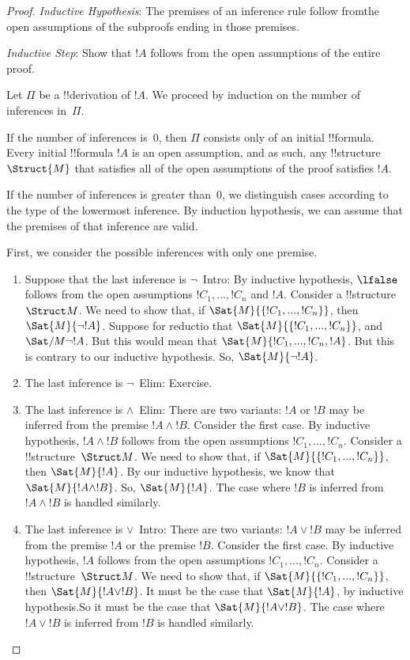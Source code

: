 \documentclass[../../include/open-logic-section]{subfiles}
\begin{document}
\begin{proof}
\emph{Inductive Hypothesis}: The premises of an inference rule follow
fromthe open assumptions of the subproofs ending in those premises.
 
\emph{Inductive Step}: Show that $!A$ follows from the open assumptions of
the entire
proof.

Let $\Pi$ be a !!{derivation} of $!A$. We proceed by
induction on the number of inferences in~$\Pi$.

If the number of inferences is~0, then $\Pi$ consists only of an
initial !!{formula}. Every initial !!{formula} $!A$ is an open assumption,
and as such, any !!{structure} $\Struct{M}$ that satisfies all of the
open assumptions of the proof satisfies $!A$.

If the number of inferences is greater than~0, we distinguish cases
according to the type of the lowermost inference. By induction
hypothesis, we can assume that the premises of that inference are
valid.

First, we consider the possible inferences with only one premise.

\begin{enumerate}
\item Suppose that the last inference is $\lnot$~Intro: 
By inductive hypothesis, $\lfalse$ follows from the open assumptions
$!C_1,...,!C_n$ and $!A$. Consider a !!{structure}~$\Struct M$. We need to
show that, if $\Sat{M}{\{!C_1,...,!C_n\}}$,
then $\Sat{M}{\lnot !A}$. Suppose for reductio that
$\Sat{M}{\{!C_1,...,!C_n\}}$,
and $\Sat/{M}{\lnot !A}$. But this would mean that $\Sat{M}{!C_1,...,!C_n,
!A}$. But this is contrary to our inductive hypothesis. So, $\Sat{M}{\lnot !A}$.
  
\item The last inference is $\lnot$~Elim: Exercise.

\item The last inference is $\land$~Elim: There are two variants: $!A$ or
$!B$ may be inferred from the premise $!A \land !B$. Consider the first
case.
By inductive hypothesis, $!A \land !B$ follows from the open assumptions 
$!C_1,...,!C_n$. Consider a !!{structure}~$\Struct M$. We need to show
that, if $\Sat{M}{\{!C_1,...,!C_n\}}$,
then $\Sat{M}{!A}$. By our inductive hypothesis, we know that
$\Sat{M}{!A\land !B}$. So, $\Sat{M}{!A}$.
  The case where $!B$ is inferred from $!A \land !B$ is handled similarly.
  
\item The last inference is $\lor$~Intro: There are two variants: $!A \lor
!B$ may be inferred from the premise $!A$ or the premise $!B$. Consider
the first case. By inductive hypothesis, $!A$ follows from the open 
assumptions $!C_1,...,!C_n$.
Consider a !!{structure}~$\Struct M$. We need to show that, if
$\Sat{M}{\{!C_1,...,!C_n\}}$,
then $\Sat{M}{!A \lor !B}$. It must be the case that $\Sat{M}{!A}$, by
inductive hypothesis.So it must be the case that $\Sat{M}{!A \lor !B}$.
  The case where $!A \lor !B$ is inferred from $!B$ is handled similarly.
  

\end{enumerate}
\end{proof}
\end{document}
